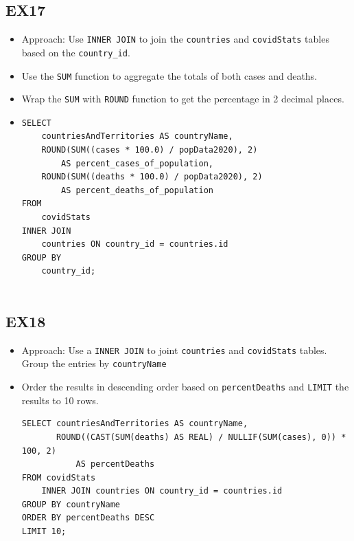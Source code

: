 \documentclass[12pt,oneside,a4paper,english]{article}
\begin{document}
\subsection{EX17}
\begin{itemize}
    \item Approach: Use \texttt{INNER JOIN} to join the \texttt{countries}  and \texttt{covidStats} tables based on the \texttt{country\_id}.
    \item Use the \texttt{SUM} function to aggregate the totals of both cases and deaths.
    \item Wrap the \texttt{SUM} with \texttt{ROUND} function to get the percentage in 2 decimal places.
\item
\begin{lstlisting}
SELECT
    countriesAndTerritories AS countryName,
    ROUND(SUM((cases * 100.0) / popData2020), 2)
        AS percent_cases_of_population,
    ROUND(SUM((deaths * 100.0) / popData2020), 2)
        AS percent_deaths_of_population
FROM
    covidStats
INNER JOIN
    countries ON country_id = countries.id
GROUP BY
    country_id;


\end{lstlisting}
\end{itemize}


\subsection{EX18}
\begin{itemize}
\item Approach: Use a \texttt{INNER JOIN} to joint \texttt{countries} and \texttt{covidStats} tables.
Group the entries by \texttt{countryName}
\item Order the results in descending order based on \texttt{percentDeaths} and \texttt{LIMIT} the results to 10 rows. 
\begin{lstlisting}
SELECT countriesAndTerritories AS countryName,
       ROUND((CAST(SUM(deaths) AS REAL) / NULLIF(SUM(cases), 0)) * 100, 2) 
           AS percentDeaths
FROM covidStats
    INNER JOIN countries ON country_id = countries.id
GROUP BY countryName
ORDER BY percentDeaths DESC
LIMIT 10;
\end{lstlisting}
\end{itemize}
\end{document}
